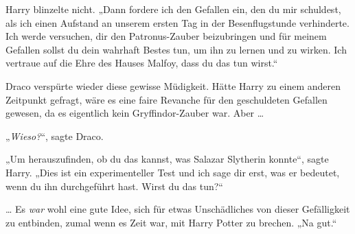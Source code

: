 Harry blinzelte nicht.
„Dann fordere ich den Gefallen ein, den du mir schuldest, als ich einen Aufstand an unserem ersten Tag in der Besenflugstunde verhinderte. Ich werde versuchen, dir den Patronus-Zauber beizubringen und für meinem Gefallen sollst du dein wahrhaft Bestes tun, um ihn zu lernen und zu wirken. Ich vertraue auf die Ehre des Hauses Malfoy, dass du das tun wirst.“

Draco verspürte wieder diese gewisse Müdigkeit. Hätte Harry zu einem anderen Zeitpunkt gefragt, wäre es eine faire Revanche für den geschuldeten Gefallen gewesen, da es eigentlich kein Gryffindor-Zauber war. Aber …

„\emph{Wieso?}“, sagte Draco.

„Um herauszufinden, ob du das kannst, was Salazar Slytherin konnte“, sagte Harry.
„Dies ist ein experimenteller Test und ich sage dir erst, was er bedeutet, wenn du ihn durchgeführt hast. Wirst du das tun?“

… Es \emph{war} wohl eine gute Idee, sich für etwas Unschädliches von dieser Gefälligkeit zu entbinden, zumal wenn es Zeit war, mit Harry Potter zu brechen.
„Na gut.“

